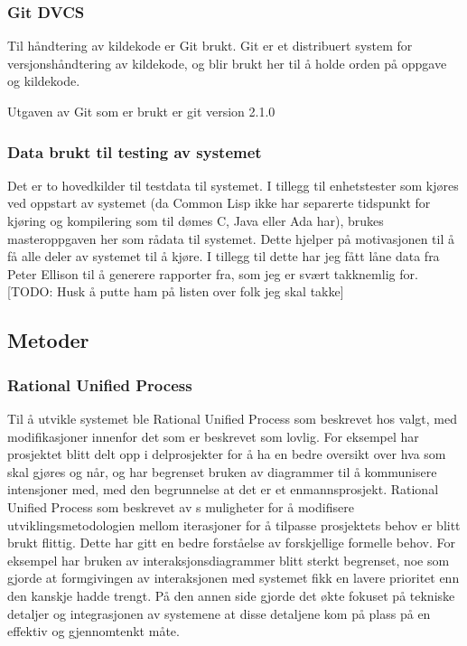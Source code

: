 \documentclass[norsk, 11pt, a4paper]{article}
\begin{document}
\subsubsection{Git DVCS}



Til håndtering av kildekode er Git brukt.
Git er et distribuert system for versjonshåndtering av kildekode, og blir brukt her til å holde orden på oppgave og kildekode.



Utgaven av Git som er brukt er git version 2.1.0



\subsubsection{Data brukt til testing av systemet}



Det er to hovedkilder til testdata til systemet. I tillegg til enhetstester som kjøres ved oppstart av systemet (da Common Lisp ikke har separerte tidspunkt for kjøring og kompilering som til dømes C, Java eller Ada har), brukes masteroppgaven her som rådata til systemet. Dette hjelper på motivasjonen til å få alle deler av systemet til å kjøre. I tillegg til dette har jeg fått låne data fra Peter Ellison til å generere rapporter fra, som jeg er svært takknemlig for. [TODO: Husk å putte ham på listen over folk jeg skal takke]



\subsection{Metoder}



\subsubsection{Rational Unified Process}



Til å utvikle systemet ble Rational Unified Process som beskrevet hos \cite{Larman2011} valgt, med modifikasjoner innenfor det som er beskrevet som lovlig. For eksempel har prosjektet blitt delt opp i delprosjekter for å ha en bedre oversikt over hva som skal gjøres og når, og har begrenset bruken av diagrammer til å kommunisere intensjoner med, med den begrunnelse at det er et enmannsprosjekt. Rational Unified Process som beskrevet av \cite{Larman2011}s muligheter for å modifisere utviklingsmetodologien mellom iterasjoner for å tilpasse prosjektets behov er blitt brukt flittig. Dette har gitt en bedre forståelse av forskjellige formelle behov. For eksempel har bruken av interaksjonsdiagrammer blitt sterkt begrenset, noe som gjorde at formgivingen av interaksjonen med systemet fikk en lavere prioritet enn den kanskje hadde trengt. På den annen side gjorde det økte fokuset på tekniske detaljer og integrasjonen av systemene at disse detaljene kom på plass på en effektiv og gjennomtenkt måte.
\end{document}
